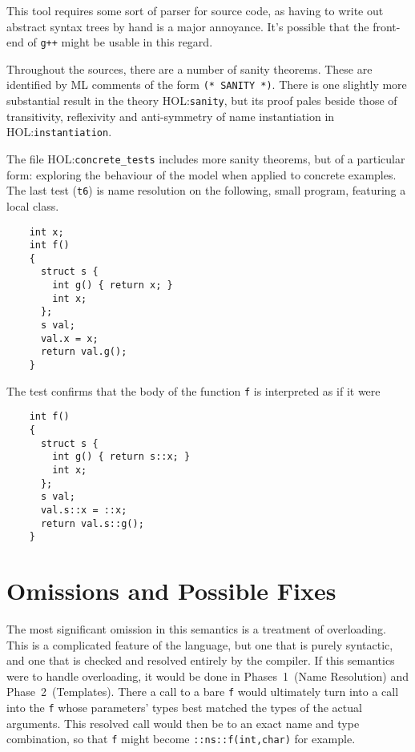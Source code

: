 \documentclass[11pt]{article}
\newcommand{\HOLfile}[1]{HOL:\texttt{#1}}
\begin{document}
This tool requires some sort of parser for \cpp{} source code, as
having to write out abstract syntax trees by hand is a major
annoyance.  It's possible that the front-end of \texttt{g++} might be
usable in this regard.

Throughout the sources, there are a number of sanity theorems.  These
are identified by ML comments of the form \texttt{(*~SANITY~*)}.
There is one slightly more substantial result in the theory
\HOLfile{sanity}, but its proof pales beside those of transitivity,
reflexivity and anti-symmetry of name instantiation in
\HOLfile{instantiation}.

The file \HOLfile{concrete_tests} includes more sanity theorems, but
of a particular form: exploring the behaviour of the model when
applied to concrete examples.  The last test (\texttt{t6}) is name
resolution on the following, small program, featuring a local class.
\begin{center}
\begin{minipage}{\textwidth}
\begin{verbatim}
    int x;
    int f()
    {
      struct s {
        int g() { return x; }
        int x;
      };
      s val;
      val.x = x;
      return val.g();
    }
\end{verbatim}
\end{minipage}
\end{center}
The test confirms that the body of the function \texttt{f} is
interpreted as if it were
\begin{center}
  \begin{minipage}{\textwidth}
\begin{verbatim}
    int f()
    {
      struct s {
        int g() { return s::x; }
        int x;
      };
      s val;
      val.s::x = ::x;
      return val.s::g();
    }
\end{verbatim}
  \end{minipage}
\end{center}


\section{Omissions and Possible Fixes}
\label{sec:omissions}

The most significant omission in this semantics is a treatment of
overloading.  This is a complicated feature of the language, but one
that is purely syntactic, and one that is checked and resolved
entirely by the compiler.  If this semantics were to handle
overloading, it would be done in Phases~1~(Name Resolution) and
Phase~2~(Templates).  There a call to a bare \texttt{f} would
ultimately turn into a call into the \texttt{f} whose parameters'
types best matched the types of the actual arguments.  This resolved
call would then be to an exact name and type combination, so that
\texttt{f} might become \texttt{::ns::f(int,char)} for example.
\end{document}

